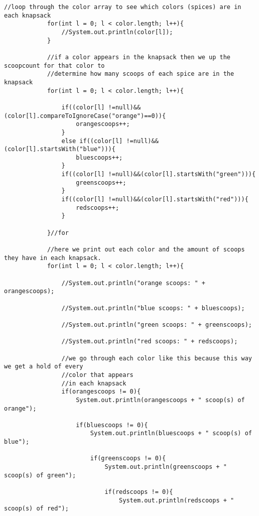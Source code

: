 \documentclass[letterpaper, 10pt,DIV=13]{scrartcl}
\numberwithin{equation}{section} %
\numberwithin{figure}{section} %
\numberwithin{table}{section} %
\begin{document}
\begin{lstlisting}[frame=single, ]
            //loop through the color array to see which colors (spices) are in each knapsack
            for(int l = 0; l < color.length; l++){
                //System.out.println(color[l]);
            }

            //if a color appears in the knapsack then we up the scoopcount for that color to 
            //determine how many scoops of each spice are in the knapsack
            for(int l = 0; l < color.length; l++){

                if((color[l] !=null)&&(color[l].compareToIgnoreCase("orange")==0)){
                    orangescoops++;
                }
                else if((color[l] !=null)&&(color[l].startsWith("blue"))){
                    bluescoops++;
                }
                if((color[l] !=null)&&(color[l].startsWith("green"))){
                    greenscoops++;
                }
                if((color[l] !=null)&&(color[l].startsWith("red"))){
                    redscoops++;
                }

            }//for

            //here we print out each color and the amount of scoops they have in each knapsack.
            for(int l = 0; l < color.length; l++){

                //System.out.println("orange scoops: " + orangescoops);

                //System.out.println("blue scoops: " + bluescoops);

                //System.out.println("green scoops: " + greenscoops);

                //System.out.println("red scoops: " + redscoops);

                //we go through each color like this because this way we get a hold of every 
                //color that appears
                //in each knapsack
                if(orangescoops != 0){
                    System.out.println(orangescoops + " scoop(s) of orange");

                    if(bluescoops != 0){
                        System.out.println(bluescoops + " scoop(s) of blue");
                        
                        if(greenscoops != 0){
                            System.out.println(greenscoops + " scoop(s) of green");

                            if(redscoops != 0){
                                System.out.println(redscoops + " scoop(s) of red");
                                

\end{lstlisting}
\end{document}
